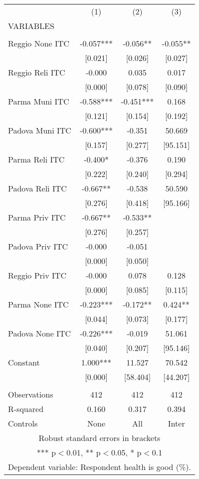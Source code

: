 \begin{tabular}{lccc} \hline
 & (1) & (2) & (3) \\
VARIABLES &  &  &  \\ \hline
 &  &  &  \\
Reggio None ITC & -0.057*** & -0.056** & -0.055** \\
 & [0.021] & [0.026] & [0.027] \\
Reggio Reli ITC & -0.000 & 0.035 & 0.017 \\
 & [0.000] & [0.078] & [0.090] \\
Parma Muni ITC & -0.588*** & -0.451*** & 0.168 \\
 & [0.121] & [0.154] & [0.192] \\
Padova Muni ITC & -0.600*** & -0.351 & 50.669 \\
 & [0.157] & [0.277] & [95.151] \\
Parma Reli ITC & -0.400* & -0.376 & 0.190 \\
 & [0.222] & [0.240] & [0.294] \\
Padova Reli ITC & -0.667** & -0.538 & 50.590 \\
 & [0.276] & [0.418] & [95.166] \\
Parma Priv ITC & -0.667** & -0.533** &  \\
 & [0.276] & [0.257] &  \\
Padova Priv ITC & -0.000 & -0.051 &  \\
 & [0.000] & [0.050] &  \\
Reggio Priv ITC & -0.000 & 0.078 & 0.128 \\
 & [0.000] & [0.085] & [0.115] \\
Parma None ITC & -0.223*** & -0.172** & 0.424** \\
 & [0.044] & [0.073] & [0.177] \\
Padova None ITC & -0.226*** & -0.019 & 51.061 \\
 & [0.040] & [0.207] & [95.146] \\
Constant & 1.000*** & 11.527 & 70.542 \\
 & [0.000] & [58.404] & [44.207] \\
 &  &  &  \\
Observations & 412 & 412 & 412 \\
R-squared & 0.160 & 0.317 & 0.394 \\
 Controls & None & All & Inter \\ \hline
\multicolumn{4}{c}{ Robust standard errors in brackets} \\
\multicolumn{4}{c}{ *** p$<$0.01, ** p$<$0.05, * p$<$0.1} \\
\multicolumn{4}{c}{ Dependent variable: Respondent health is good (\%).} \\
\end{tabular}

